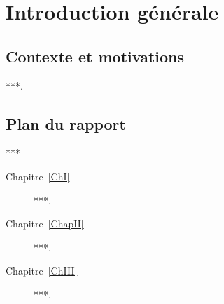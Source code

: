 \chapter*{Introduction générale}
{}

\section*{Contexte et motivations}
***.

\section*{Plan du rapport}
***

\begin{description}
  	\item[Chapitre~\ref{ChI}] ***.
  	\item[Chapitre~\ref{ChapII}]***.
  	\item[Chapitre~\ref{ChIII}] ***.
\end{description}
